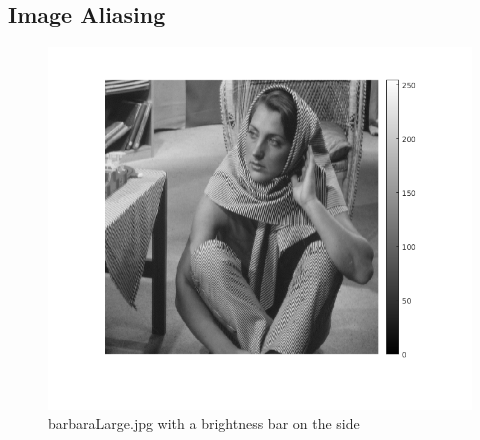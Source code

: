 \documentclass{article}
\begin{document}
\subsection{Image Aliasing}
\begin{figure}[H]
    \centering
    \includegraphics[width=0.8\linewidth]{barb_bar.png}
    \caption{barbaraLarge.jpg with a brightness bar on the side}
\end{figure}
\end{document}

